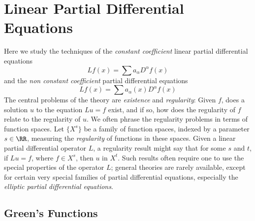 \part{Linear Partial Differential Equations}

Here we study the techniques of the \emph{constant coefficient} linear partial differential equations
%
\[ Lf(x) = \sum a_\alpha D^\alpha f(x) \]
%
and the \emph{non constant coefficient} partial differential equations
%
\[ Lf(x) = \sum a_\alpha(x) D^\alpha f(x) \]
%
The central problems of the theory are \emph{existence} and \emph{regularity}: Given $f$, does a solution $u$ to the equation $Lu = f$ exist, and if so, how does the regularity of $f$ relate to the regularity of $u$. We often phrase the regularity problems in terms of function spaces. Let $\{ X^s \}$ be a family of function spaces, indexed by a parameter $s \in \RR$, measuring the \emph{regularity} of functions in these spaces. Given a linear partial differential operator $L$, a regularity result might say that for some $s$ and $t$, if $Lu = f$, where $f \in X^s$, then $u$ in $X^t$. Such results often require one to use the special properties of the operator $L$; general theories are rarely available, except for certain very special families of partial differential equations, especially the \emph{elliptic partial differential equations}.

\chapter{Green's Functions}

